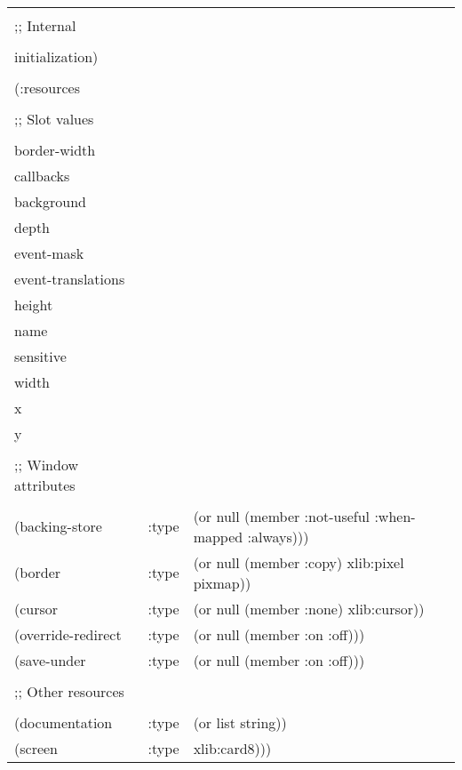 \documentclass[twoside]{book}
\begin{document}
\begin{sloppy}
\begin{flushright}
\parbox[t]{6.125in}{
\tt
\begin{tabular}{lll}
\raggedright
&\\
;; Internal\footnotemark \\
&\\
   initialization) \\
&\\
(:resources & \\
& \\
;; Slot values \\
& \\
 border-width       \\
 callbacks \\
 background \\ 
 depth \\
 event-mask \\
 event-translations \\
 height \\
 name \\
 sensitive \\
 width \\
 x \\
 y \\
&\\
;; Window attributes \\
&\\
 (backing-store &      :type & (or null (member :not-useful :when-mapped
:always))) \\
  (border &             :type & (or null (member :copy) xlib:pixel pixmap)) \\
  (cursor &             :type & (or null (member :none) xlib:cursor)) \\
  (override-redirect &  :type & (or null (member :on :off))) \\
  (save-under &         :type & (or null (member :on :off))) \\
&\\
;; Other resources \\
&\\
  (documentation &      :type & (or list string)) \\
  (screen &             :type & xlib:card8)))
\end{tabular}
}

\end{flushright}



\end{sloppy}
\end{document}
